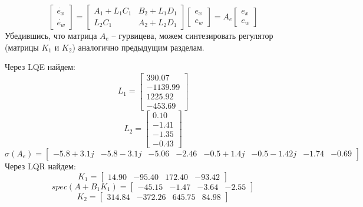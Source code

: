 \[
    \begin{bmatrix}
        \dot{e_x} \\
        \dot{e_w}
    \end{bmatrix} = 
    \begin{bmatrix}
        A_1 + L_1C_1 & B_2 + L_1D_1 \\
        L_2C_1 & A_2 + L_2D_1
    \end{bmatrix}
    \begin{bmatrix}
        e_x \\
        e_w
    \end{bmatrix} = A_e 
    \begin{bmatrix}
        e_x \\
        e_w
    \end{bmatrix}
\] 
Убедившись, что матрица \(A_e\) -- гурвицева, можем синтезировать регулятор (матрицы $K_1$ и $K_2$) аналогично предыдущим разделам.

Через LQE найдем:
\[L_1 = \begin{bmatrix}
    390.07\\
   -1139.99\\
    1225.92\\
   -453.69
  \end{bmatrix}\]
  \[L_2 = \begin{bmatrix}
    0.10\\
   -1.41\\
   -1.35\\
   -0.43
  \end{bmatrix}\]
  \[\sigma (A_e) = \begin{bmatrix}
    -5.8 + 3.1j & -5.8 -3.1j & -5.06  & -2.46  & -0.5 + 1.4j & -0.5 -1.42j & -1.74  & -0.69 
   \end{bmatrix}\]
Через LQR найдем:
   \[K_1 = \begin{bmatrix}
    14.90 & -95.40 &  172.40 & -93.42
  \end{bmatrix}\]
  \[spec(A + B_1 K_1) = \begin{bmatrix}
   -45.15 & -1.47 & -3.64 & -2.55
  \end{bmatrix}\]
  \[K_2 = \begin{bmatrix}
    314.84 & -372.26 &  645.75 &  84.98
  \end{bmatrix}\]


